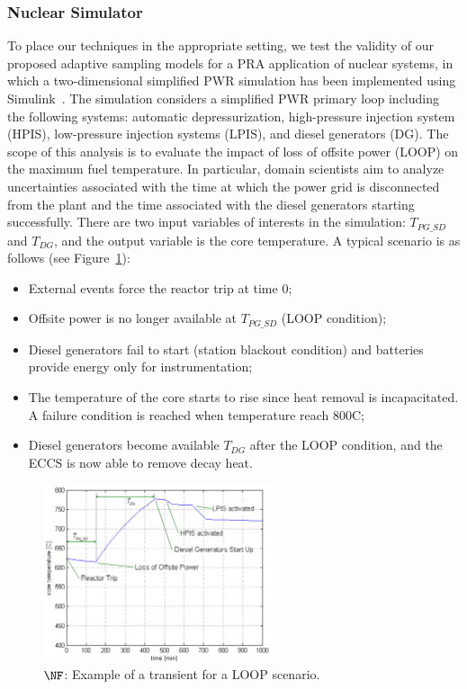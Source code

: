 
\subsubsection{Nuclear Simulator}

To place our techniques in the appropriate setting, we test the validity of our proposed adaptive sampling models for a PRA application of nuclear systems, in which a two-dimensional simplified PWR simulation has been implemented using Simulink~\cite{MandelliSmith2012}.
%
The simulation considers a simplified PWR primary loop including the following systems: automatic depressurization, high-pressure injection system (HPIS), low-pressure injection systems (LPIS), and diesel generators (DG).
%
The scope of this analysis is to evaluate the impact of loss of offsite power (LOOP) on the maximum fuel temperature.
%
In particular, domain scientists aim to analyze uncertainties associated with the time at which the power grid is disconnected from the plant and the time associated with the diesel generators starting successfully.
%
There are two input variables of interests in the simulation: $T_{PG\_SD}$ and $T_{DG}$, and the output variable is the core temperature.
%
A typical scenario is as follows (see Figure~\ref{fig:nuclearTransient}):
\begin{itemize} \denselist
  \item External events force the reactor trip at time $0$;
  \item Offsite power is no longer available at $T_{PG\_SD}$ (LOOP condition);
  \item Diesel generators fail to start (station blackout condition) and batteries provide energy only for instrumentation;
  \item The temperature of the core starts to rise since heat removal is incapacitated. A failure condition is reached when temperature reach 800C;
  \item Diesel generators become available $T_{DG}$ after the LOOP condition, and the ECCS is now able to remove decay heat.
\end{itemize}

\begin{figure}[!ht]
  \centering
  \includegraphics[width=0.6\textwidth]{figs/chap5/scenExample.pdf}
  \caption{$\protect\NF$: Example of a transient for a LOOP scenario.}
  \label{fig:nuclearTransient}
\end{figure}

